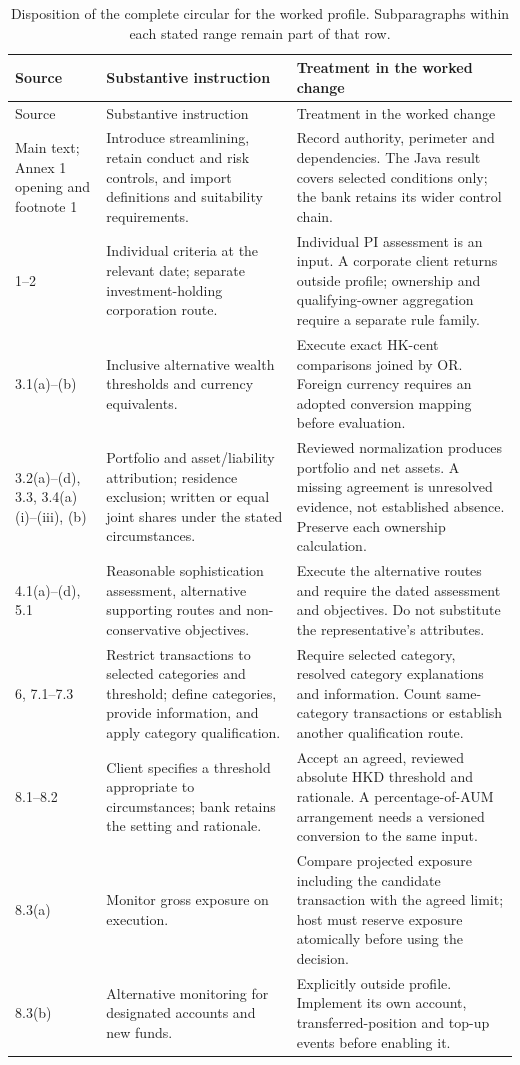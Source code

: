 \begin{longtable}{P{0.14\textwidth}P{0.37\textwidth}P{0.39\textwidth}}
\caption{Disposition of the complete circular for the worked profile. Subparagraphs
within each stated range remain part of that row.}\label{tab:circular-inventory}\\
\toprule Source & Substantive instruction & Treatment in the worked change \\\midrule
\endfirsthead
\toprule Source & Substantive instruction & Treatment in the worked change \\\midrule
\endhead
Main text; Annex 1 opening and footnote 1 & Introduce streamlining, retain conduct and risk controls, and import definitions and suitability requirements. & Record authority, perimeter and dependencies. The Java result covers selected conditions only; the bank retains its wider control chain.\\
1--2 & Individual criteria at the relevant date; separate investment-holding corporation route. & Individual PI assessment is an input. A corporate client returns outside profile; ownership and qualifying-owner aggregation require a separate rule family.\\
3.1(a)--(b) & Inclusive alternative wealth thresholds and currency equivalents. & Execute exact HK-cent comparisons joined by OR. Foreign currency requires an adopted conversion mapping before evaluation.\\
3.2(a)--(d), 3.3, 3.4(a)(i)--(iii), (b) & Portfolio and asset/liability attribution; residence exclusion; written or equal joint shares under the stated circumstances. & Reviewed normalization produces portfolio and net assets. A missing agreement is unresolved evidence, not established absence. Preserve each ownership calculation.\\
4.1(a)--(d), 5.1 & Reasonable sophistication assessment, alternative supporting routes and non-conservative objectives. & Execute the alternative routes and require the dated assessment and objectives. Do not substitute the representative's attributes.\\
6, 7.1--7.3 & Restrict transactions to selected categories and threshold; define categories, provide information, and apply category qualification. & Require selected category, resolved category explanations and information. Count same-category transactions or establish another qualification route.\\
8.1--8.2 & Client specifies a threshold appropriate to circumstances; bank retains the setting and rationale. & Accept an agreed, reviewed absolute HKD threshold and rationale. A percentage-of-AUM arrangement needs a versioned conversion to the same input.\\
8.3(a) & Monitor gross exposure on execution. & Compare projected exposure including the candidate transaction with the agreed limit; host must reserve exposure atomically before using the decision.\\
8.3(b) & Alternative monitoring for designated accounts and new funds. & Explicitly outside profile. Implement its own account, transferred-position and top-up events before enabling it.\\
\bottomrule
\end{longtable}
